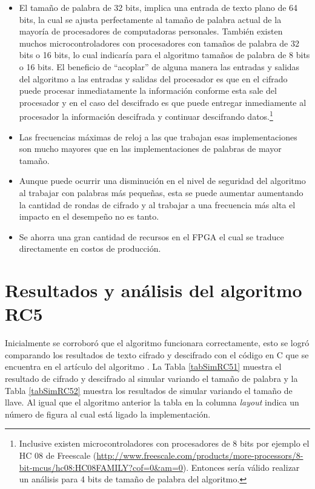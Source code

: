 \begin{itemize}
\item El tamaño de palabra de 32 bits, implica una entrada de texto plano de 64 bits, la cual se ajusta perfectamente al tamaño de palabra actual de la mayoría de procesadores de computadoras personales. También existen muchos microcontroladores con procesadores con tamaños de palabra de 32 bits o 16 bits, lo cual indicaría para el algoritmo tamaños de palabra de 8 bits o 16 bits. El beneficio de ``acoplar'' de alguna manera las entradas y salidas del algoritmo a las entradas y salidas del procesador es que en el cifrado puede procesar inmediatamente la información conforme esta sale del procesador y en el caso del descifrado es que puede entregar inmediamente al procesador la información descifrada y continuar descifrando datos.\footnote{Inclusive existen microcontroladores con procesadores de 8 bits por ejemplo el HC 08 de Freescale (\url{http://www.freescale.com/products/more-processors/8-bit-mcus/hc08:HC08FAMILY?cof=0&am=0}). Entonces sería válido realizar un análisis para 4 bits de tamaño de palabra del algoritmo.}

\item Las frecuencias máximas de reloj a las que trabajan esas implementaciones son mucho mayores que en las implementaciones de palabras de mayor tamaño.

\item Aunque puede ocurrir una disminución en el nivel de seguridad del algoritmo al trabajar con palabras más pequeñas, esta se puede aumentar aumentando la cantidad de rondas de cifrado y al trabajar a una frecuencia más alta el impacto en el desempeño no es tanto.

\item Se ahorra una gran cantidad de recursos en el FPGA el cual se traduce directamente en costos de producción.
\end{itemize}

\clearpage
\section{Resultados y análisis del algoritmo RC5}
Inicialmente se corroboró que el algoritmo funcionara correctamente, esto se logró comparando los resultados de texto cifrado y descifrado con el código en C que se encuentra en el artículo del algoritmo \citep{rivest}. La Tabla \ref{tabSimRC51} muestra el resultado de cifrado y descifrado al simular variando el tamaño de palabra y la Tabla \ref{tabSimRC52} muestra los resultados de simular variando el tamaño de llave. Al igual que el algoritmo anterior la tabla en la columna \textit{layout} indica un número de figura al cual está ligado la implementación.

